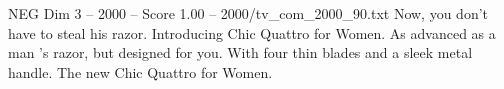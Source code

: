 \begin{textsample}{NEG Dim 3 – 2000 – Score 1.00 – 2000/tv\_com\_2000\_90.txt}  \label{ex:f3_neg_007}
Now, you don't have to steal his razor.
Introducing Chic Quattro for Women.
As advanced as a man 's razor, but designed for you.
With four thin blades and a sleek metal handle.
The new Chic Quattro for Women.

\end{textsample}

